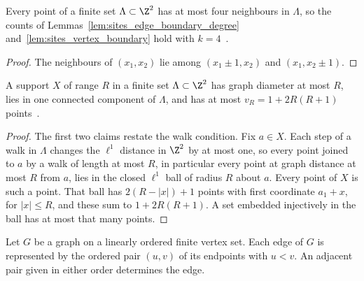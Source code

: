 \begin{lemma}
    \label{lem:sites_plane_degree}
    \leanok
    Every point of a finite set $\Lambda\subset\Z^2$ has at most four neighbours in
    $\Lambda$, so the counts of Lemmas~\ref{lem:sites_edge_boundary_degree}
    and~\ref{lem:sites_vertex_boundary} hold with $k=4$~\cite{OpenAI2026AreaLaw}.
\end{lemma}
\begin{proof}\leanok
    The neighbours of $(x_1,x_2)$ lie among $(x_1\pm1,x_2)$ and $(x_1,x_2\pm1)$.
\end{proof}

\begin{lemma}
    \label{lem:sites_plane_domain_support}
    \leanok
    A support $X$ of range $R$ in a finite set $\Lambda\subset\Z^2$ has graph
    diameter at most $R$, lies in one connected component of $\Lambda$, and has
    at most $v_R=1+2R(R+1)$ points~\cite{OpenAI2026AreaLaw}.
\end{lemma}
\begin{proof}\leanok
    The first two claims restate the walk condition. Fix $a\in X$. Each step of
    a walk in $\Lambda$ changes the $\ell^1$ distance in $\Z^2$ by at most one,
    so every point joined to $a$ by a walk of length at most $R$, in particular
    every point at graph distance at most $R$ from $a$, lies in the closed
    $\ell^1$ ball of radius $R$ about $a$. Every point of $X$ is such a point.
    That ball has $2(R-\lvert x\rvert)+1$ points with first coordinate
    $a_1+x$, for $\lvert x\rvert\le R$, and these sum to $1+2R(R+1)$. A set
    embedded injectively in the ball has at most that many points.
\end{proof}

\begin{definition}
    \label{def:sites_edge}
    \leanok
    Let $G$ be a graph on a linearly ordered finite vertex set. Each edge of $G$
    is represented by the ordered pair $(u,v)$ of its endpoints with $u<v$. An
    adjacent pair given in either order determines the edge.
\end{definition}

